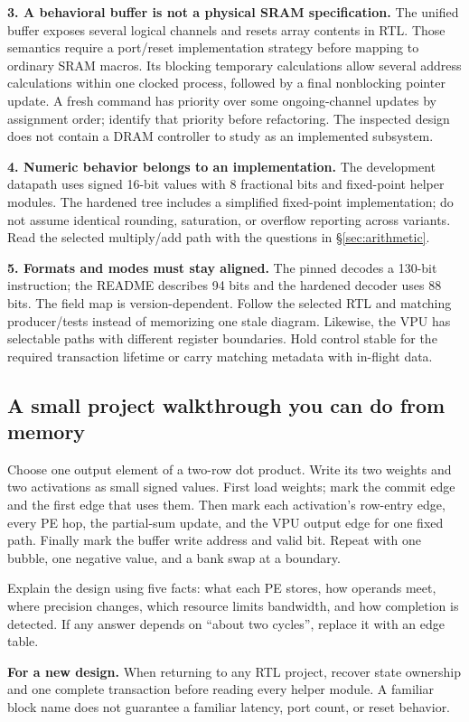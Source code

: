 \documentclass[11pt]{article}
\newcommand{\cd}[1]{{\frenchspacing\texttt{\detokenize{#1}}}}
\newcommand{\transfer}[1]{\par\textbf{For a new design.} #1\par}
\newcommand{\sect}[1]{\hyperref[sec:#1]{\S\ref*{sec:#1}}}
\begin{document}
\textbf{3. A behavioral buffer is not a physical SRAM specification.}
The unified buffer exposes several logical channels and resets array contents in RTL.
Those semantics require a port/reset implementation strategy before mapping to ordinary SRAM macros.
Its blocking temporary calculations allow several address calculations within one clocked process, followed by a final nonblocking pointer update.
A fresh command has priority over some ongoing-channel updates by assignment order; identify that priority before refactoring.
The inspected design does not contain a DRAM controller to study as an implemented subsystem.

\textbf{4. Numeric behavior belongs to an implementation.}
The development datapath uses signed 16-bit values with 8 fractional bits and fixed-point helper modules.
The hardened tree includes a simplified fixed-point implementation; do not assume identical rounding, saturation, or overflow reporting across variants.
Read the selected multiply/add path with the questions in \sect{arithmetic}.

\textbf{5. Formats and modes must stay aligned.}
The pinned \cd{src/control_unit.sv} decodes a 130-bit instruction; the README describes 94 bits and the hardened decoder uses 88 bits.
The field map is version-dependent. Follow the selected RTL and matching producer/tests instead of memorizing one stale diagram.
Likewise, the VPU has selectable paths with different register boundaries. Hold control stable for the required transaction lifetime or carry matching metadata with in-flight data.

\subsection{A small project walkthrough you can do from memory}
Choose one output element of a two-row dot product. Write its two weights and two activations as small signed values.
First load weights; mark the commit edge and the first edge that uses them.
Then mark each activation's row-entry edge, every PE hop, the partial-sum update, and the VPU output edge for one fixed path.
Finally mark the buffer write address and valid bit. Repeat with one bubble, one negative value, and a bank swap at a boundary.

Explain the design using five facts: what each PE stores, how operands meet, where precision changes, which resource limits bandwidth, and how completion is detected.
If any answer depends on ``about two cycles'', replace it with an edge table.
\transfer{When returning to any RTL project, recover state ownership and one complete transaction before reading every helper module.
A familiar block name does not guarantee a familiar latency, port count, or reset behavior.}
\end{document}
